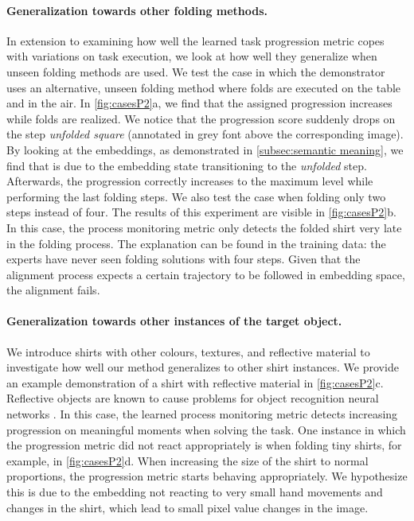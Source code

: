 \documentclass[\home/main.tex]{subfiles}
\begin{document}
\paragraph{Generalization towards other folding methods.}
In extension to examining how well the learned task progression metric copes with variations on task execution, we look at how well they generalize when unseen folding methods are used. We test the case in which the demonstrator uses an alternative, unseen folding method where folds are executed on the table and in the air. In \cref{fig:casesP2}a, we find that the assigned progression increases while folds are realized. We notice that the progression score suddenly drops on the step \textit{unfolded square} (annotated in grey font above the corresponding image). By looking at the embeddings, as demonstrated in \cref{subsec:semantic meaning}, we find that is due to the embedding state transitioning to the \textit{unfolded} step. Afterwards, the progression correctly increases to the maximum level while performing the last folding steps.
We also test the case when folding only two steps instead of four. The results of this experiment are visible in \cref{fig:casesP2}b. In this case, the process monitoring metric only detects the folded shirt very late in the folding process. The explanation can be found in the training data: the experts have never seen folding solutions with four steps. Given that the alignment process expects a certain trajectory to be followed in embedding space, the alignment fails.

\paragraph{Generalization towards other instances of the target object.}
We introduce shirts with other colours, textures, and reflective material to investigate how well our method generalizes to other shirt instances. We provide an example demonstration of a shirt with reflective material in \cref{fig:casesP2}c. Reflective objects are known to cause problems for object recognition neural networks \autocite{sajjan2019cleargrasp}. In this case, the learned process monitoring metric detects increasing progression on meaningful moments when solving the task. One instance in which the progression metric did not react appropriately is when folding tiny shirts, for example, in \cref{fig:casesP2}d. When increasing the size of the shirt to normal proportions, the progression metric starts behaving appropriately. We hypothesize this is due to the embedding not reacting to very small hand movements and changes in the shirt, which lead to small pixel value changes in the image.
\end{document}
